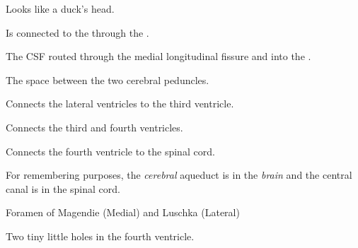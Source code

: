 \begin{coloredlist}
    \item {}
    \begin{coloredlist}
        \item
    \end{coloredlist}
    \item {}
    \begin{coloredlist}
        \item Looks like a duck's head.
        \item Is connected to the  through the .
    \end{coloredlist}
    \item The CSF routed through the medial longitudinal fissure and into the .
    \item {}
    \begin{coloredlist}
        \item The space between the two cerebral peduncles.
    \end{coloredlist}
    \item {}
    \begin{coloredlist}
        \item Connects the lateral ventricles to the third ventricle.
    \end{coloredlist}
    \item {}
    \begin{coloredlist}
        \item Connects the third and fourth ventricles.
    \end{coloredlist}
    \item {}
    \begin{coloredlist}
        \item Connects the fourth ventricle to the spinal cord.
        \item For remembering purposes, the \textit{cerebral} aqueduct is in the \textit{brain} and the central canal is in the spinal cord.
    \end{coloredlist}
    \item {}
    \begin{coloredlist}
        \item Foramen of Magendie (Medial) and Luschka (Lateral)
        \begin{coloredlist}
            \item Two tiny little holes in the fourth ventricle.
        \end{coloredlist}
    \end{coloredlist}
\end{coloredlist}

